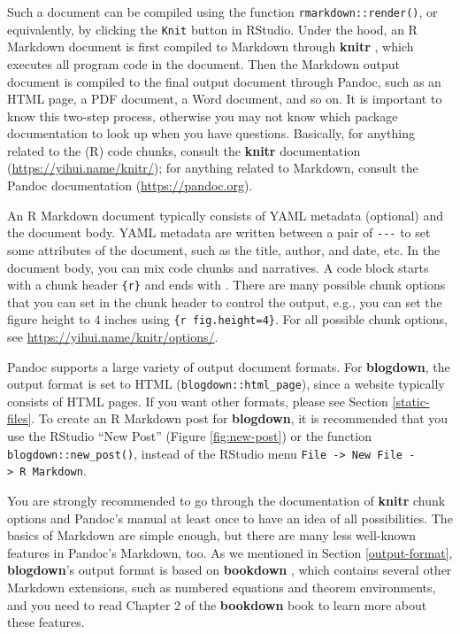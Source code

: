 \documentclass[12pt,]{krantz}
\theoremstyle{definition}
\theoremstyle{definition}
\theoremstyle{definition}
\theoremstyle{remark}
\begin{document}
Such a document can be compiled using the function
\texttt{rmarkdown::render()}, or equivalently, by clicking the
\texttt{Knit} button in RStudio. Under the hood, an R Markdown document
is first compiled to Markdown through \textbf{knitr}
\citep{R-knitr}, which executes all program code in the document. Then
the Markdown output document is compiled to the final output document
through Pandoc, such as an HTML page, a PDF document, a Word document,
and so on. It is important to know this two-step process, otherwise you
may not know which package documentation to look up when you have
questions. Basically, for anything related to the (R) code chunks,
consult the \textbf{knitr} documentation
(\url{https://yihui.name/knitr/}); for anything related to Markdown,
consult the Pandoc documentation (\url{https://pandoc.org}).

An R Markdown document typically consists of YAML metadata
(optional) and the document body. YAML metadata are written between a
pair of \texttt{-\/-\/-} to set some attributes of the document, such as
the title, author, and date, etc. In the document body, you can mix code
chunks and narratives. A code block starts with a chunk header
\texttt{\textasciigrave{}\textasciigrave{}\textasciigrave{}\{r\}} and
ends with \texttt{\textasciigrave{}\textasciigrave{}\textasciigrave{}}.
There are many possible chunk options that you can set in the chunk
header to control the output, e.g., you can set the figure height to 4
inches using
\texttt{\textasciigrave{}\textasciigrave{}\textasciigrave{}\{r\ fig.height=4\}}.
For all possible chunk options, see
\url{https://yihui.name/knitr/options/}.

Pandoc supports a large variety of output document formats. For
\textbf{blogdown}, the output format is set to HTML
(\texttt{blogdown::html\_page}), since a website typically consists of
HTML pages. If you want other formats, please see Section
\ref{static-files}. To create an R Markdown post for \textbf{blogdown},
it is recommended that you use the RStudio ``New Post'' (Figure
\ref{fig:new-post}) or the function \texttt{blogdown::new\_post()},
instead of the RStudio menu
\texttt{File\ -\textgreater{}\ New\ File\ -\textgreater{}\ R\ Markdown}.

You are strongly recommended to go through the documentation of
\textbf{knitr} chunk options and Pandoc's manual at least once to have
an idea of all possibilities. The basics of Markdown are simple enough,
but there are many less well-known features in Pandoc's Markdown, too.
As we mentioned in Section \ref{output-format}, \textbf{blogdown}'s
output format is based on \textbf{bookdown} \citep{R-bookdown}, which
contains several other Markdown extensions, such as numbered equations
and theorem environments, and you need to read Chapter 2 of the
\textbf{bookdown} book \citep{xie2016} to learn more about these
features.
\end{document}
